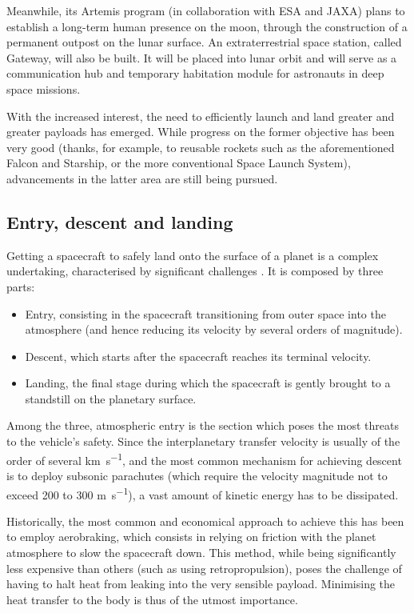 Meanwhile, its Artemis program (in collaboration with ESA and JAXA) plans to establish a long-term human presence on the moon, through the construction of a permanent outpost on the lunar surface. An extraterrestrial space station, called Gateway, will also be built. It will be placed into lunar orbit and will serve as a communication hub and temporary habitation module for astronauts in deep space missions.

With the increased interest, the need to efficiently launch and land greater and greater payloads has emerged. While progress on the former objective has been very good (thanks, for example, to reusable rockets such as the aforementioned Falcon and Starship, or the more conventional Space Launch System), advancements in the latter area are still being pursued.

\subsection{Entry, descent and landing}
Getting a spacecraft to safely land onto the surface of a planet is a complex undertaking, characterised by significant challenges \cite{aerothermonotes}. It is composed by three parts: 
\begin{itemize}
    \item Entry, consisting in the spacecraft transitioning from outer space into the atmosphere (and hence reducing its velocity by several orders of magnitude).
    \item Descent, which starts after the spacecraft reaches its terminal velocity.
    \item Landing, the final stage during which the spacecraft is gently brought to a standstill on the planetary surface.
\end{itemize}

Among the three, atmospheric entry is the section which poses the most threats to the vehicle's safety. Since the interplanetary transfer velocity is usually of the order of several \si{\km\per\s}, and the most common mechanism for achieving descent is to deploy subsonic parachutes (which require the velocity magnitude not to exceed 200 to 300 \si{\m\per\s}), a vast amount of kinetic energy has to be dissipated. 

Historically, the most common and economical approach to achieve this has been to employ aerobraking, which consists in relying on  friction with the planet atmosphere to slow the spacecraft down. This method, while being significantly less expensive than others (such as using retropropulsion), poses the challenge of having to halt heat from leaking into the very sensible payload. Minimising the heat transfer to the body is thus of the utmost importance.

